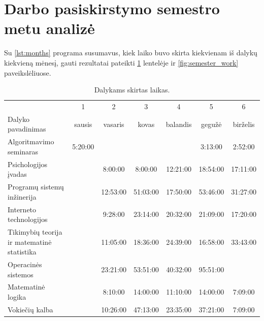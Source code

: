 \section{Darbo pasiskirstymo semestro metu analizė}

Su \ref{lst:months} programa susumavus, kiek laiko buvo skirta kiekvienam
iš dalykų kiekvieną mėnesį, gauti rezultatai pateikti
\ref{tab:months} lentelėje ir \ref{fig:semester_work} paveikslėliuose.

\begin{table}
  \centering
  \begin{tabular}{|l|c|c|c|c|c|c|}
\hline
&1&2&3&4&5&6\\
Dalyko pavadinimas&sausis&vasaris&kovas&balandis&gegužė&birželis\\
\hline
Algoritmavimo seminaras&5:20:00&&&&3:13:00&2:52:00\\
Psichologijos įvadas&&8:00:00&8:00:00&12:21:00&18:54:00&17:11:00\\
Programų sistemų inžinerija&&12:53:00&51:03:00&17:50:00&53:46:00&31:27:00\\
Interneto technologijos&&9:28:00&23:14:00&20:32:00&21:09:00&17:20:00\\
Tikimybių teorija ir matematinė statistika&&11:05:00&18:36:00&24:39:00&16:58:00&33:43:00\\
Operacinės sistemos&&23:21:00&53:51:00&40:32:00&95:51:00&\\
Matematinė logika&&8:10:00&14:00:00&11:10:00&14:00:00&7:09:00\\
Vokiečių kalba&&10:26:00&47:13:00&23:35:00&37:21:00&7:09:00\\
\hline
  \end{tabular}
  \caption{Dalykams skirtas laikas.}
  \label{tab:months}
\end{table}

